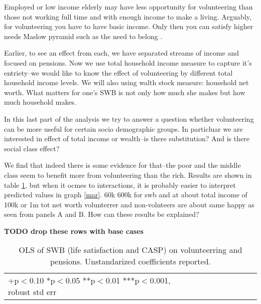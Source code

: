 \documentclass[10pt, letterpaper]{article}
\begin{document}
\begin{spacing}{1.4}
 Employed or low income elderly may have less opportunity for
 volunteering than those not working full time and with enough income to make a
 living. %
%
Arguably, for volunteering you have to have basic income. Only then you can
satisfy  higher needs  Maslow pyramid  such as the need to belong \citep{maslow87}.

Earlier,  to see an effect from each, we have separated streams of income and focused on pensions. 
Now we use total household income measure to capture it's entriety--we would
like to know the effect of volunteering by different total household income
levels. We will  also using walth stock measure: household net worth.
%
What matters for one's SWB is not only how much she makes but how much household makes.

In this last part of the analysis we try to answer a question whether
volunteering can be more useful for certain socio demographic groups. In
particluar we are interested in effect of total income or wealth--is there
substitution? And is there social class effect?

We find that indeed there is some evidence for that--the poor and the middle
class seem to benefit more from volunteering than the rich. Results are shown in
table \ref{regDw6}, but when it ocmes to interactions, it is probably easier to
interpret predicted values in graph \ref{mar}.
%
60k 600k for swb and 
at about total income of 100k or 1m tot net worth volunterrer and non-volnteers
are about same happy as seen from panels A and B.
% 
How can these results be explained?

\textbf{TODO drop these rows with base cases}
\begin{spacing}{.9}
\begin{table}[H]\centering \caption{OLS of SWB  (life satisfaction and CASP) on
    volunteerring and pensions.  Unstandarized coefficients reported.}  \begin{scriptsize} \begin{tabular}{p{1.8in}p{.5in}p{.5in}p{.5in}p{.5in}|p{.5in}p{.5in}p{.5in}p{.5in}p{.5in}p{.4in}p{.5in}p{.4in}}\hline 
      \hline\multicolumn{5}{l}{+p$<$0.10 *p$<$0.05 **p$<$0.01 ***p$<$0.001,
        robust std err} \end{tabular}\label{regDw6} \end{scriptsize}\end{table}
\end{spacing}



\end{spacing}
\end{document}
